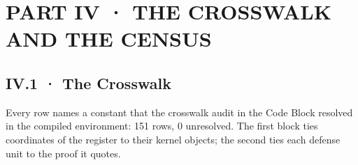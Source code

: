 \documentclass[10pt,twocolumn]{article}
\begin{document}
\onecolumn

\hypertarget{part-iv-the-crosswalk-and-the-census}{%
\section{PART IV · THE CROSSWALK AND THE
CENSUS}\label{part-iv-the-crosswalk-and-the-census}}

\hypertarget{iv.1-the-crosswalk}{%
\subsection{IV.1 · The Crosswalk}\label{iv.1-the-crosswalk}}

Every row names a constant that the crosswalk audit in the Code Block
resolved in the compiled environment: 151 rows, 0 unresolved. The first
block ties coordinates of the register to their kernel objects; the
second ties each defense unit to the proof it quotes.
\end{document}
